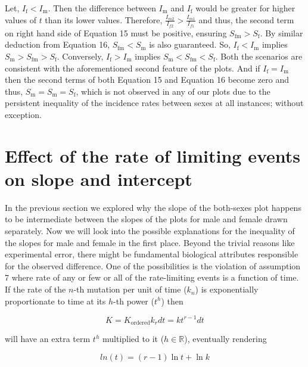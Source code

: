 \documentclass[lineno,sn-basic, Numbered]{sn-jnl}%
\theoremstyle{thmstyleone}%
\theoremstyle{thmstyletwo}%
\theoremstyle{thmstylethree}%
\begin{document}
\vspace{0.5cm}


Let, \( I_{\text{f}} < I_{\text{m}} \). Then the difference between \( I_{\text{m}} \) and \( I_{\text{f}} \) would be greater for higher values of \( t \) than its lower values. Therefore, \(\frac{I_{m2}}{I_{f2}} > \frac{I_{m1}}{I_{f1}}\) and thus, the second term on right hand side of Equation 15 must be positive, ensuring \( S_{\text{fm}} > S_{\text{f}} \). By similar deduction from Equation 16, \( S_{\text{fm}} < S_{\text{m}} \) is also guaranteed. So, \( I_{\text{f}} < I_{\text{m}} \) implies \( S_{\text{m}} > S_{\text{fm}} > S_{\text{f}} \). Conversely, \( I_{\text{f}} > I_{\text{m}} \) implies \( S_{\text{m}} < S_{\text{fm}} < S_{\text{f}} \). Both the scenarios are consistent with the aforementioned second feature of the plots. And if \( I_{\text{f}} = I_{\text{m}} \) then the second terms of both Equation 15 and Equation 16 become zero and thus, \( S_{\text{m}} = S_{\text{m}} = S_{\text{f}} \), which is not observed in any of our plots due to the persistent inequality of the incidence rates between sexes at all instances; without exception.

\section{Effect of the rate of limiting events on slope and intercept}

In the previous section we explored why the slope of the both-sexes plot happens to be intermediate between the slopes of the plots for male and female drawn separately. Now we will look into the possible explanations for the inequality of the slopes for male and female in the first place. Beyond the trivial reasons like experimental error, there might be fundamental biological attributes responsible for the observed difference. One of the possibilities is the violation of assumption 7 where rate of any or few or all of the rate-limiting events is a function of time. If the rate of the \(n\)-th mutation per unit of time (\(k_n\)) is exponentially proportionate to time at its \(h\)-th power (\(t^h\)) then

\begin{equation}
     K = K_{\text{ordered}} k_r dt = kt^{r-1}dt 
\end{equation}

will have an extra term \(t^h\) multiplied to it (\(h \in \mathbb{R}\)), eventually rendering

\begin{equation}
    ln(t) = (r - 1) \ln t + \ln k
\end{equation}
\end{document}
